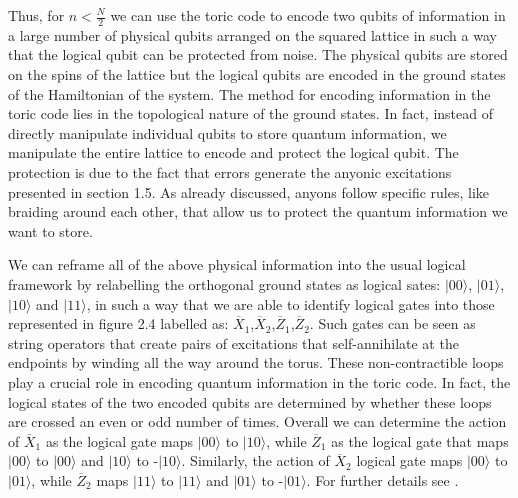\documentclass{Configuration_Files/PoliMi3i_thesis}
\begin{document}
Thus, for $n < \frac{N}{2}$ we can use the toric code to encode two qubits of information in a large number of physical qubits arranged on the squared lattice in such a way that the logical qubit can be protected from noise. The physical qubits are stored on the spins of the lattice but the logical qubits are encoded in the ground states of the Hamiltonian of the system. 
The method for encoding information in the toric code lies in the topological nature of the ground states. In fact, instead of directly manipulate individual qubits to store quantum information, we manipulate the entire lattice to encode and protect the logical qubit. The protection is due to the fact that errors generate the anyonic excitations presented in section 1.5. As already discussed, anyons follow specific rules, like braiding around each other, that allow us to protect the quantum information we want to store.\newline 

We can reframe all of the above physical information into the usual logical framework by relabelling the orthogonal ground states as logical sates: $|00\rangle$, $|01\rangle$, $|10\rangle$ and $|11\rangle$, in such a way that we are able to identify logical gates into those represented in figure 2.4 labelled as: $\overline{X}_1$,$\overline{X}_2$,$\overline{Z}_1$,$\overline{Z}_2$. \newline 
Such gates can be seen as string operators that create pairs of excitations that self-annihilate at the endpoints by winding all the way around the torus. 
These non-contractible loops play a crucial role in encoding quantum information in the toric code. In fact, the logical states of the two encoded qubits are determined by whether these loops are crossed an even or odd number of times. \newline
Overall we can determine the action of $\overline{X}_1$ as the logical gate maps $|00\rangle$ to $|10\rangle$, while $\overline{Z}_1$ as the logical gate that maps $|00\rangle$ to $|00\rangle$ and $|10\rangle$ to -$|10\rangle$. \newline
Similarly, the action of $\overline{X}_2$ logical gate maps $|00\rangle$ to $|01\rangle$, while $\overline{Z}_2$ maps $|11\rangle$ to $|11\rangle$ and $|01\rangle$ to -$|01\rangle$. For further details see \cite{Her20}.\newline
\end{document}

